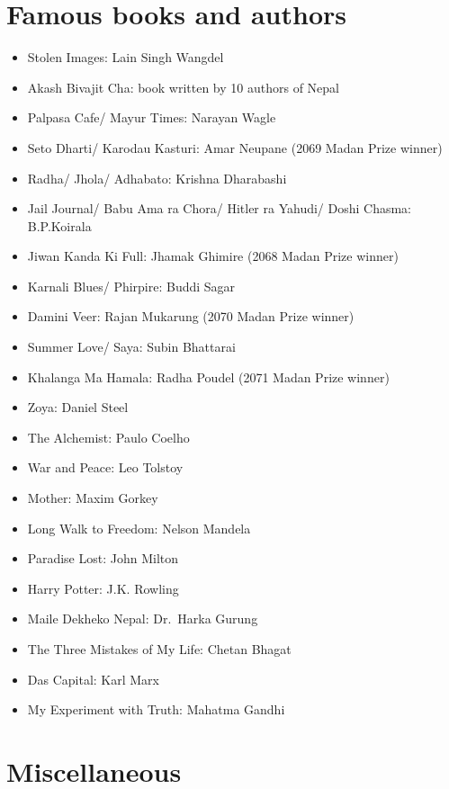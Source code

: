 \documentclass[
  openany]{book}
\providecommand{\tightlist}{%
  \setlength{\itemsep}{0pt}\setlength{\parskip}{0pt}}
\begin{document}
\hypertarget{famous-books-and-authors}{%
\section{Famous books and authors}\label{famous-books-and-authors}}

\begin{itemize}
\tightlist
\item
  Stolen Images: Lain Singh Wangdel
\item
  Akash Bivajit Cha: book written by 10 authors of Nepal
\item
  Palpasa Cafe/ Mayur Times: Narayan Wagle
\item
  Seto Dharti/ Karodau Kasturi: Amar Neupane (2069 Madan Prize winner)
\item
  Radha/ Jhola/ Adhabato: Krishna Dharabashi
\item
  Jail Journal/ Babu Ama ra Chora/ Hitler ra Yahudi/ Doshi Chasma: B.P.Koirala
\item
  Jiwan Kanda Ki Full: Jhamak Ghimire (2068 Madan Prize winner)
\item
  Karnali Blues/ Phirpire: Buddi Sagar
\item
  Damini Veer: Rajan Mukarung (2070 Madan Prize winner)
\item
  Summer Love/ Saya: Subin Bhattarai
\item
  Khalanga Ma Hamala: Radha Poudel (2071 Madan Prize winner)
\item
  Zoya: Daniel Steel
\item
  The Alchemist: Paulo Coelho
\item
  War and Peace: Leo Tolstoy
\item
  Mother: Maxim Gorkey
\item
  Long Walk to Freedom: Nelson Mandela
\item
  Paradise Lost: John Milton
\item
  Harry Potter: J.K. Rowling
\item
  Maile Dekheko Nepal: Dr.~Harka Gurung
\item
  The Three Mistakes of My Life: Chetan Bhagat
\item
  Das Capital: Karl Marx
\item
  My Experiment with Truth: Mahatma Gandhi
\end{itemize}

\hypertarget{miscellaneous-3}{%
\section{Miscellaneous}\label{miscellaneous-3}}
\end{document}
